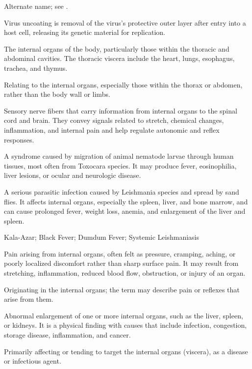  Alternate name; see .

 Virus uncoating is removal of the virus's protective outer layer after entry into a host cell, releasing its genetic material for replication.

 The internal organs of the body, particularly those within the thoracic and abdominal
cavities. The thoracic viscera include the heart, lungs, esophagus, trachea, and thymus.

 Relating to the internal organs, especially those within the thorax or abdomen, rather than the body wall or limbs.

 Sensory nerve fibers that carry information from internal organs to the spinal cord and brain. They convey signals related to stretch, chemical changes, inflammation, and internal pain and help regulate autonomic and reflex responses.

 A syndrome caused by migration of animal nematode larvae through human tissues, most often from Toxocara species. It may produce fever, eosinophilia, liver lesions, or ocular and neurologic disease.

 A serious parasitic infection caused by Leishmania species and spread by sand flies. It affects internal organs, especially the spleen, liver, and bone marrow, and can cause prolonged fever, weight loss, anemia, and enlargement of the liver and spleen.

\synonyms
Kala-Azar; Black Fever; Dumdum Fever; Systemic Leishmaniasis

 Pain arising from internal organs, often felt as pressure, cramping, aching, or poorly localized discomfort rather than sharp surface pain. It may result from stretching, inflammation, reduced blood flow, obstruction, or injury of an organ.

 Originating in the internal organs; the term may describe pain or reflexes that arise from them.

 Abnormal enlargement of one or more internal organs, such as the liver, spleen, or kidneys. It is a physical finding with causes that include infection, congestion, storage disease, inflammation, and cancer.

 Primarily affecting or tending to target the internal organs (viscera), as a disease or infectious agent.

